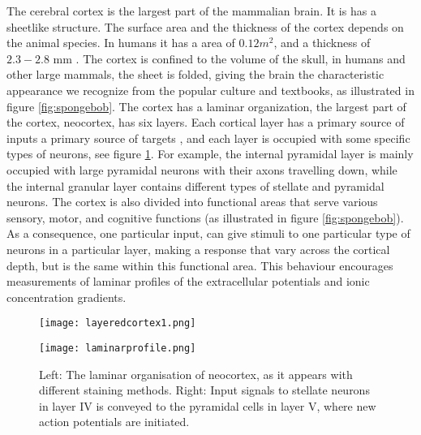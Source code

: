 \documentclass{article}
\begin{document}
The cerebral cortex is the largest part of the mammalian brain. It is has a sheetlike structure. The surface area and the thickness of the cortex depends on the animal species. In humans it has a area of $0.12 m^2$, and a thickness of $2.3 - 2.8$ mm \cite{wikipedia}. The cortex is confined to the volume of the skull, in humans and other large mammals, the sheet is folded, giving the brain the characteristic appearance we recognize from the popular culture and textbooks, as illustrated in figure  \ref{fig:spongebob}.  The cortex has a laminar organization, the largest part of the cortex, neocortex, has six layers. Each cortical layer has a primary source of inputs a primary source of targets \cite{Neuroscience}, and each layer is occupied with some specific types of neurons, see figure \ref{fig:laminarcortex}. For example, the internal pyramidal layer is mainly occupied with large pyramidal neurons with their axons travelling down, while the  internal granular layer contains different types of stellate and pyramidal neurons. The cortex is also divided into functional areas that serve various sensory, motor, and cognitive functions (as illustrated in figure \ref{fig:spongebob}). As a consequence, one particular input, can give stimuli to one particular type of neurons in a particular layer, making a response that vary across the cortical depth, but is the same within this functional area. This behaviour encourages measurements of laminar profiles of the extracellular potentials and ionic concentration gradients.  




\begin{figure}[!tbp]
  \centering
  \begin{minipage}[b]{0.45\textwidth}
    \texttt{[image: layeredcortex1.png]}
  \end{minipage}
  \begin{minipage}[b]{0.45\textwidth}
    \texttt{[image: laminarprofile.png]}
  \end{minipage}  
   \caption{Left: The laminar organisation of neocortex, as it appears with different staining methods. Right: Input signals to stellate neurons in layer IV is conveyed to the pyramidal cells in layer V, where new action potentials are initiated.}
  \label{fig:laminarcortex}
\end{figure}
\end{document}
